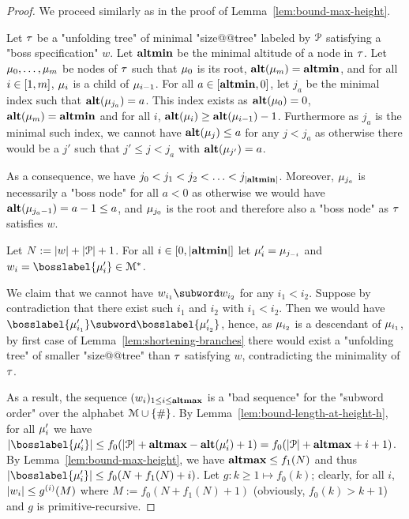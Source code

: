 \begin{proof}
	We proceed similarly as in the proof of Lemma~\ref{lem:bound-max-height}.
	
	Let $\tau$ be a "unfolding tree" of minimal "size@@tree" labeled by $\mathcal{P}$ satisfying a "boss specification" $w$. Let $\mathbf{altmin}$ be the minimal altitude of a node in $\tau$. Let $\mu_0, \ldots, \mu_m$ be nodes of $\tau$ such that $\mu_0$ is its root, $\mathbf{alt}(\mu_m) = \mathbf{altmin}$, and for all $i\in [1,m]$, $\mu_i$ is a child of $\mu_{i-1}$.
	For all $a \in [\mathbf{altmin},0]$, let $j_a$ be the minimal index such that $\mathbf{alt}(\mu_{j_a}) = a$. This index exists as $\mathbf{alt}(\mu_0) = 0$, $\mathbf{alt}(\mu_m) = \mathbf{altmin}$ and for all $i$, $\mathbf{alt}(\mu_{i}) \geq \mathbf{alt}(\mu_{i-1})-1$.
	Furthermore as $j_a$ is the minimal such index, we cannot have $\mathbf{alt}(\mu_j) \leq a$ for any $j < j_a$ as otherwise there would be a $j'$ such that $j' \leq j < j_a$ with $\mathbf{alt}(\mu_{j'}) = a$.
	
	As a consequence, we have $j_0 < j_1 < j_2 < \ldots < j_{|\mathbf{altmin}|}$. Moreover, $\mu_{j_a}$ is necessarily a "boss node" for all $a<0$ as otherwise we would have $\mathbf{alt}(\mu_{j_a-1}) = a-1 \leq a$, and $\mu_{j_0}$ is the root and therefore also a "boss node" as $\tau$ satisfies $w$.
	
	Let $N := |w| + |\mathcal{P}|+1$. For all $i \in [0,|\mathbf{altmin}|]$ let $\mu'_i = \mu_{j_{-i}}$ and $w_i = \bosslabel{\node'_{i}} \in \messages^*$.
	
	We claim that we cannot have $w_{i_1}\subword w_{i_2}$ for any  $i_1< i_2$.
	Suppose by contradiction that there exist such $i_1$ and $i_2$ with $i_1 < i_2$. Then we would have $\bosslabel{\node'_{i_1}} \subword \bosslabel{\node'_{i_2}}$, hence, as $\mu_{i_2}$ is a descendant of $\mu_{i_1}$, by first case of Lemma~\ref{lem:shortening-branches} there would exist a "unfolding tree" of smaller "size@@tree" than $\tau$ satisfying $w$, contradicting the minimality of $\tau$.
	
	As a result, the sequence $(w_i)_{1\leq i \leq \mathbf{altmax}}$ is a "bad sequence" for the "subword order" over the alphabet $\mathcal{M}\cup\{\#\}$.
	By Lemma~\ref{lem:bound-length-at-height-h}, for all $\mu'_i$ we have $\size{\bosslabel{\node'_i}} \leq f_0(\size{\prot} + \altmax - \altitude{\node'_i}+1) = f_0(\size{\prot} + \altmax +i+1)$.
	By Lemma~\ref{lem:bound-max-height}, we have $\mathbf{altmax} \leq f_1(N)$ and thus $\size{\bosslabel{\node'_i}} \leq  f_0(N+f_1(N)+i)$. Let $g: k \geq 1 \mapsto f_0(k)$; clearly, for all $i$, $|w_i| \leq g^{(i)}(M)$ where $M := f_0(N + f_1(N)+1)$ (obviously, $f_0(k) > k+1$) and $g$ is primitive-recursive.
	

\end{proof}
